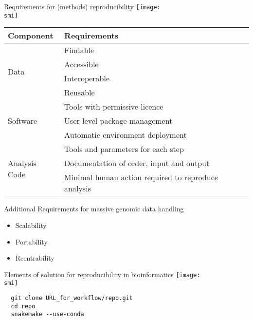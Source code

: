 \documentclass[10pt]{beamer}
\def\smi{out/ln/updir/mw-gcthesis-oral/library.bib}
\begin{document}
\begin{frame}{Requirements for (methods) reproducibility}
  \def\smi{out/ln/updir/mw-gcthesis-oral/ink/reproducibility/arrow_reproducibility.pdf}
  \texttt{[image: \\smi]}

  {\scriptsize
  \begin{tabular}{@{}ll@{}}
    \toprule
    Component                      & Requirements                             \\ \midrule
    \multirow{4}{*}{Data}          & Findable                                 \\
    & Accessible                               \\
    & Interoperable                            \\ 
    & Reusable                                 \\ \midrule
    \multirow{3}{*}{Software}             & Tools with permissive licence \\
    & User-level package management            \\
    & Automatic environment deployment           \\ \midrule
    \multirow{3}{*}{Analysis Code} & Tools and parameters for each step       \\
    & Documentation of order, input and output \\
    & Minimal human action required to reproduce analysis \\ \bottomrule
  \end{tabular}
  }
\end{frame}
\begin{frame}{Additional Requirements for massive genomic data handling}
  \begin{itemize}
    \item Scalability
    \item Portability
    \item Reentrability
  \end{itemize}
\end{frame}
\begin{frame}[fragile]{Elements of solution for reproducibility in bioinformatics}
  \def\smi{out/ln/updir/mw-gcthesis-oral/ink/reproducibility/arrow_reproducibility_solutions.pdf}
  \texttt{[image: \\smi]}
  \begin{lstlisting}
  git clone URL_for_workflow/repo.git
  cd repo
  snakemake --use-conda
  \end{lstlisting}
\end{frame}
\end{document}
